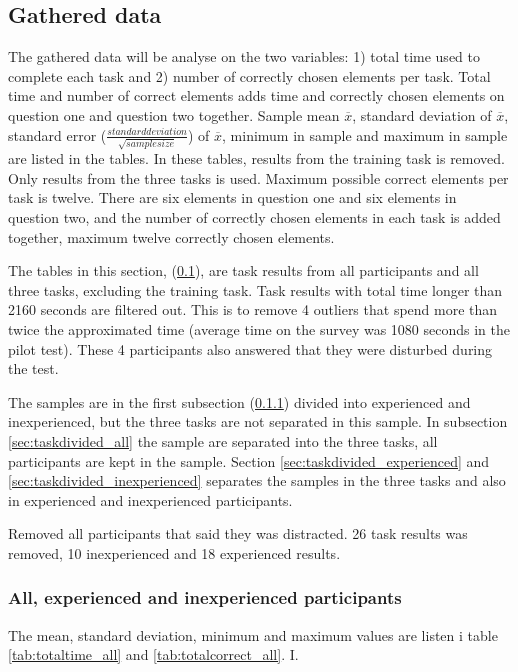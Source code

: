\subsection{Gathered data}\label{sec:gathereddata}

The gathered data will be analyse on the two variables: 1) total time used to complete each task and 2) number of correctly chosen elements per task. Total time and number of correct elements adds time and correctly chosen elements on question one and question two together. Sample mean $\overline{x}$, standard deviation of $\overline{x}$, standard error ($\frac{standard deviation}{\sqrt{sample size}}$) of $\overline{x}$, minimum in sample and maximum in sample are listed in the tables. In these tables, results from the training task is removed. Only results from the three tasks is used. Maximum possible correct elements per task is twelve. There are six elements in question one and six elements in question two, and the number of correctly chosen elements in each task is added together, maximum twelve correctly chosen elements.

The tables in this section, (\ref{sec:gathereddata}), are task results from all participants and all three tasks, excluding the training task. Task results with total time longer than 2160 seconds are filtered out. This is to remove 4 outliers that spend more than twice the approximated time (average time on the survey was 1080 seconds in the pilot test). These 4 participants also answered that they were disturbed during the test.

 The samples are in the first subsection (\ref{sec:alltasks}) divided into experienced and inexperienced, but the three tasks are not separated in this sample. In subsection \ref{sec:taskdivided_all} the sample are separated into the three tasks, all participants are kept in the sample. Section \ref{sec:taskdivided_experienced}  and \ref{sec:taskdivided_inexperienced} separates the samples in the three tasks and also in experienced and inexperienced participants. 
 
Removed all participants that said they was distracted. 26 task results was removed, 10 inexperienced and 18 experienced results.

\subsubsection{All,  experienced and inexperienced participants}\label{sec:alltasks}

The mean, standard deviation, minimum and maximum values are listen i table \ref{tab:totaltime_all} and \ref{tab:totalcorrect_all}. I. 

